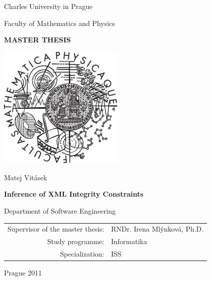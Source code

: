 \documentclass[a4paper,12pt,twoside,openright]{report}
\theoremstyle{definition}
\def\mfauthor{Matej Vitásek}
\def\mfadvisor{RNDr. Ire\-na Mlýn\-ko\-vá, Ph.D.}
\def\mfplacedate{Prague 2011}
\begin{document}
\pagestyle{empty}
\begin{center}

\large

Charles University in Prague

\medskip

Faculty of Mathematics and Physics

\vfill

{\bf\Large MASTER THESIS}

\vfill

\centerline{\mbox{\includegraphics[width=60mm]{logo}}}

\vfill
\vspace{5mm}

{\LARGE \mfauthor}

\vspace{15mm}

{\LARGE\bfseries Inference of XML Integrity Constraints}

\vfill

Department of Software Engineering

\vfill

\begin{tabular}{rl}

Supervisor of the master thesis: & 	\mfadvisor \\
\noalign{\vspace{2mm}}
Study programme: & Informatika \\
\noalign{\vspace{2mm}}
Specialization: & ISS \\
\end{tabular}

\vfill

\mfplacedate 

\end{center}
\end{document}
